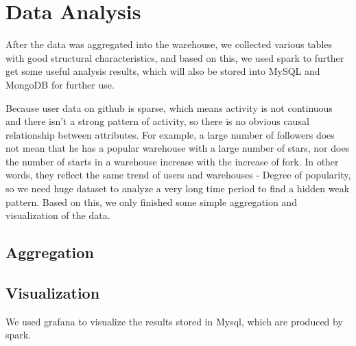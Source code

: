 \section{Data Analysis}

After the data was aggregated into the warehouse, we collected various tables with good structural characteristics, and based on this, we used spark to further get some useful analysis results, which will also be stored into MySQL and MongoDB for further use.


Because user data on github is sparse, which means activity is not continuous and there isn't a strong pattern of activity, so there is no obvious causal relationship between attributes. For example, a large number of followers does not mean that he has a popular warehouse with a large number of stars, nor does the number of starts in a warehouse increase with the increase of fork. In other words, they reflect the same trend of users and warehouses - Degree of popularity, so we need huge dataset to analyze a very long time period to find a hidden weak pattern. Based on this, we only finished some simple aggregation and visualization of the data.


\subsection{Aggregation}





\subsection{Visualization}
We used grafana to visualize the results stored in Mysql, which are produced by spark. 